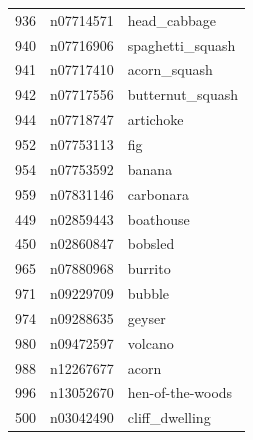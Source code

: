 \begin{table}
\begin{tabular}{cll}
936 & n07714571 & head_cabbage \\
940 & n07716906 & spaghetti_squash \\
941 & n07717410 & acorn_squash \\
942 & n07717556 & butternut_squash \\
944 & n07718747 & artichoke \\
952 & n07753113 & fig \\
954 & n07753592 & banana \\
959 & n07831146 & carbonara \\
449 & n02859443 & boathouse \\
450 & n02860847 & bobsled \\
965 & n07880968 & burrito \\
971 & n09229709 & bubble \\
974 & n09288635 & geyser \\
980 & n09472597 & volcano \\
988 & n12267677 & acorn \\
996 & n13052670 & hen-of-the-woods \\
500 & n03042490 & cliff_dwelling \\
\bottomrule
\end{tabular}
\end{table}

